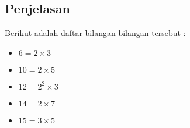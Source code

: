 \documentclass{article}
\begin{document}
\subsection*{Penjelasan}
Berikut adalah daftar bilangan bilangan tersebut :
\begin{itemize}
    \item $6  = 2   \times 3$
    \item $10 = 2   \times 5$
    \item $12 = 2^2 \times 3$
    \item $14 = 2   \times 7$
    \item $15 = 3   \times 5$
\end{itemize}

\pagebreak
\end{document}
